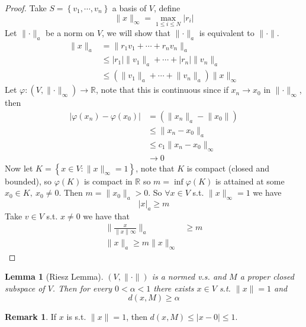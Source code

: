 \documentclass[11pt,a4paper]{article}
\theoremstyle{definition}
\newtheorem{remark}[definition]{Remark}
\theoremstyle{plain}
\newtheorem{lemma}[definition]{Lemma}
\theoremstyle{remark}
\newcommand{\R}{\mathbb{R}}
\renewcommand{\set}[1]{\left\{ #1 \right\}}
\newcommand{\abs}[1]{\lvert #1 \rvert}
\newcommand{\norm}[1]{\lVert #1 \rVert}
\newcommand{\1}{\mathbbm{1}}
\begin{document}
\begin{proof}
    Take $S = \set{v_1, \cdots, v_n}$ a basis of $V$, define 
    $$\norm{x}_\infty = \max_{1 \le i \le N} \abs{r_i}$$
    Let $\norm{\cdot}_a$ be a norm on $V$, we will show that $\norm{\cdot}_a$ is equivalent to $\norm{\cdot}$. 
    \begin{align*}
        \norm{x}_a &= \norm{r_1 v_1 + \cdots + r_n v_n}_a \\
        &\le \abs{r_1} \norm{v_1}_a + \cdots + \abs{r_n} \norm{v_n}_a \\
        &\le (\norm{v_1}_a + \cdots + \norm{v_n}_a) \norm{x}_\infty 
    \end{align*} 
    Let $\varphi \colon (V, \norm{\cdot}_\infty) \to \R$, note that this is continuous since if $x_n \to x_0$ in $\norm{\cdot}_\infty$, then 
    \begin{align*}
        \abs{\varphi(x_n) - \varphi(x_0)} &= (\norm{x_n}_a - \norm{x_0}) \\
        &\le \norm{x_n - x_0}_a \\
        &\le c_1 \norm{x_n - x_0}_\infty \\
        &\to 0
    \end{align*}
    Now let $K = \set{x \in V \colon \norm{x}_\infty = 1}$, note that $K$ is compact (closed and bounded), so 
    $\varphi(K)$ is compact in $\R$ so $m = \inf \varphi(K)$ is attained at some $x_0 \in K, \ x_0 \ne 0$. Then 
    $m = \norm{x_0}_a > 0$. So $\forall x \in V$ s.t. $\norm{x}_\infty = 1$ we have 
    $$\abs{x}_a \ge m$$
    Take $v \in V$ s.t. $x \ne 0$ we have that 
    \begin{align*}
        \norm{\frac{x}{\norm{x}\infty}}_a &\ge m \\
        \norm{x}_a \ge m \norm{x}_\infty
    \end{align*}
\end{proof}

\begin{lemma}[Riesz Lemma]
    $(V, \norm{\cdot})$ is a normed v.s. and $M$ a proper closed subspace of $V$. Then for every $0 < \alpha < 1$ there exists $x \in V$ s.t. 
    $\norm{x} = 1$ and 
    $$d(x, M) \ge \alpha$$
\end{lemma}

\begin{remark}
    If $x$ is s.t. $\norm{x} = 1$, then $d(x, M) \le \abs{x - 0} \le 1$.
\end{remark}
\end{document}
